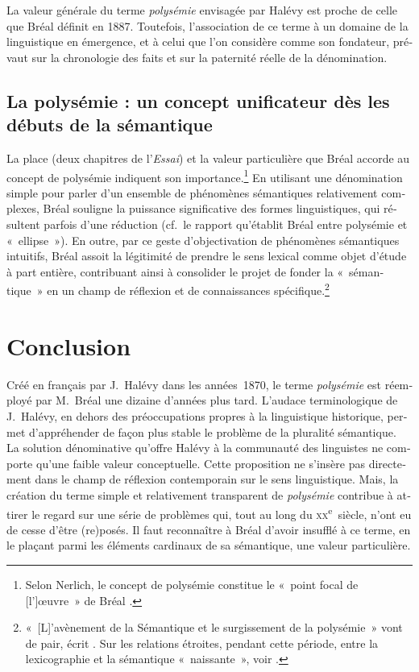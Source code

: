 \documentclass[french,output=paper,colorlinks,citecolor=brown]{../langscibook}
\begin{document}
\begin{otherlanguage}{french}
La valeur générale du terme \textit{polysémie} envisagée par Halévy est proche de celle que Bréal définit en 1887. Toutefois, l'association de ce terme à un domaine de la linguistique en émergence, et à celui que l’on considère comme son fondateur, prévaut sur la chronologie des faits et sur la paternité réelle de la dénomination.

\subsection{La polysémie : un concept unificateur dès les débuts de la sémantique}

La place (deux chapitres de l’\textit{Essai}) et la valeur particulière que Bréal accorde au concept de polysémie indiquent son importance.\footnote{Selon Nerlich, le concept de polysémie constitue le «~point focal de [l’]œuvre~» de Bréal \citep[22]{Nerlich1993}.} En utilisant une dénomination simple pour parler d’un ensemble de phénomènes sémantiques relativement complexes, Bréal souligne la puissance significative des formes linguistiques, qui résultent parfois d’une réduction (cf.~le rapport qu’établit Bréal entre polysémie et «~ellipse~»). En outre, par ce geste d’objectivation de phénomènes sémantiques intuitifs, Bréal assoit la légitimité de prendre le sens lexical comme objet d’étude à part entière, contribuant ainsi à consolider le projet de fonder la «~sémantique~» en un champ de réflexion et de connaissances spécifique.\footnote{«~[L]’avènement de la Sémantique et le surgissement de la polysémie~» vont de pair, écrit \citet[83]{Delesalle1987}. Sur les relations étroites, pendant cette période, entre la lexicographie et la sémantique «~naissante~», voir \citet{BiscontiDe-Mauro2016}.}

\section{Conclusion}

Créé en français par J.~Halévy dans les années~1870, le terme \textit{polysémie} est réemployé par M.~Bréal une dizaine d’années plus tard. L’audace terminologique de J.~Halévy, en dehors des préoccupations propres à la linguistique historique, permet d’appréhender de façon plus stable le problème de la pluralité sémantique. La solution dénominative qu’offre Halévy à la communauté des linguistes ne comporte qu’une faible valeur conceptuelle. Cette proposition ne s’insère pas directement dans le champ de réflexion contemporain sur le sens linguistique. Mais, la création du terme simple et relativement transparent de \textit{polysémie} contribue à attirer le regard sur une série de problèmes qui, tout au long du \textsc{xx}\textsuperscript{e}~siècle, n’ont eu de cesse d’être (re)posés. Il faut reconnaître à Bréal d’avoir insufflé à ce terme, en le plaçant parmi les éléments cardinaux de sa sémantique, une valeur particulière.


\end{otherlanguage}
\end{document}
